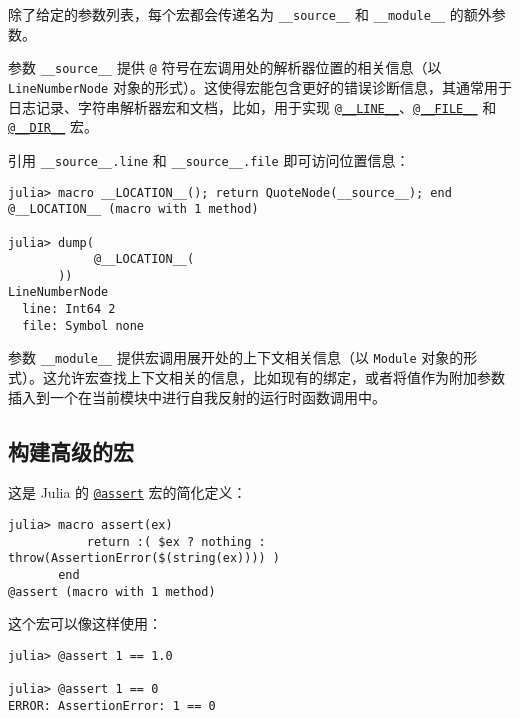 除了给定的参数列表，每个宏都会传递名为 \texttt{\_\_source\_\_} 和 \texttt{\_\_module\_\_} 的额外参数。



参数 \texttt{\_\_source\_\_} 提供 \texttt{@} 符号在宏调用处的解析器位置的相关信息（以 \texttt{LineNumberNode} 对象的形式）。这使得宏能包含更好的错误诊断信息，其通常用于日志记录、字符串解析器宏和文档，比如，用于实现 \hyperlink{277452200962288519}{\texttt{@\_\_LINE\_\_}}、\hyperlink{1518763743618824993}{\texttt{@\_\_FILE\_\_}} 和 \hyperlink{12719499456415901450}{\texttt{@\_\_DIR\_\_}} 宏。



引用 \texttt{\_\_source\_\_.line} 和 \texttt{\_\_source\_\_.file} 即可访问位置信息：




\begin{verbatim}
julia> macro __LOCATION__(); return QuoteNode(__source__); end
@__LOCATION__ (macro with 1 method)

julia> dump(
            @__LOCATION__(
       ))
LineNumberNode
  line: Int64 2
  file: Symbol none
\end{verbatim}



参数 \texttt{\_\_module\_\_} 提供宏调用展开处的上下文相关信息（以 \texttt{Module} 对象的形式）。这允许宏查找上下文相关的信息，比如现有的绑定，或者将值作为附加参数插入到一个在当前模块中进行自我反射的运行时函数调用中。



\hypertarget{12271969370439662350}{}


\subsection{构建高级的宏}



这是 Julia 的 \hyperlink{4796942656392369899}{\texttt{@assert}} 宏的简化定义：




\begin{verbatim}
julia> macro assert(ex)
           return :( $ex ? nothing : throw(AssertionError($(string(ex)))) )
       end
@assert (macro with 1 method)
\end{verbatim}



这个宏可以像这样使用：




\begin{verbatim}
julia> @assert 1 == 1.0

julia> @assert 1 == 0
ERROR: AssertionError: 1 == 0
\end{verbatim}




